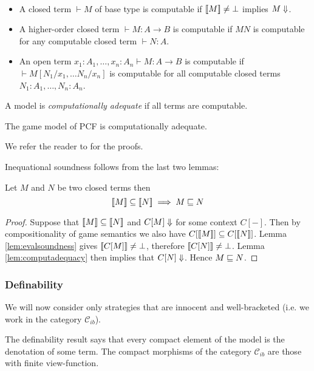\begin{dfn} \
\begin{itemize}
\item A closed term $\vdash M$ of base type is computable if ${[\![ M ]\!]} \neq \bot$
implies $M \Downarrow$.
\item A higher-order closed term $\vdash M : A\rightarrow B$ is computable if $M N$ is computable for any computable closed term $\vdash  N:A$.
\item An open term $x_1 : A_1, \ldots, x_n : A_n \vdash M : A\rightarrow B$ is computable if $\vdash M [N_1/x_1, \ldots N_n/x_n]$ is computable
for all computable closed terms $N_1:A_1, \ldots, N_n:A_n$.
\end{itemize}
\end{dfn}

A model is \emph{computationally adequate} if all
terms are computable.
\begin{lem}
\label{lem:computadequacy}
The game model of PCF is
computationally adequate.
\end{lem}
We refer the reader to \cite{abramsky:game-semantics-tutorial} for
the proofs.

Inequational soundness follows from the last two lemmas:
\begin{prop}
\label{prop:ineqsoundness} Let $M$ and $N$ be two closed terms then
$${[\![ M ]\!]} \subseteq {[\![N ]\!]} \implies  M \sqsubseteq N $$
\end{prop}
\begin{proof}
  Suppose that ${[\![ M ]\!]} \subseteq {[\![N ]\!]}$ and $C[M] \Downarrow$ for some context $C[-]$. Then by compositionality of game semantics we also have
  $C[{[\![ M ]\!]}] \subseteq C[{[\![ N ]\!]}]$.
  Lemma \ref{lem:evalsoundness} gives ${[\![ C[M] ]\!]} \neq \bot$, therefore ${[\![ C[N] ]\!]} \neq \bot$.
  Lemma \ref{lem:computadequacy} then implies that $C[N] \Downarrow$.
  Hence $M \sqsubseteq N$.
\end{proof}

\subsubsection{Definability}

We will now consider only strategies that are innocent and
well-bracketed (i.e. we work in the category $\mathcal{C}_{ib}$).

The definability result says that every compact element of the model
is the denotation of some term.
The compact morphisms of the category $\mathcal{C}_{ib}$ are those
with finite view-function.

